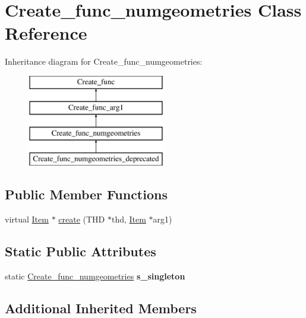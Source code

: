 \hypertarget{classCreate__func__numgeometries}{}\section{Create\+\_\+func\+\_\+numgeometries Class Reference}
\label{classCreate__func__numgeometries}
Inheritance diagram for Create\+\_\+func\+\_\+numgeometries\+:\begin{figure}[H]
\begin{center}
\leavevmode
\includegraphics[height=4.000000cm]{classCreate__func__numgeometries}
\end{center}
\end{figure}
\subsection*{Public Member Functions}
\begin{DoxyCompactItemize}
\item 
virtual \mbox{\hyperlink{classItem}{Item}} $\ast$ \mbox{\hyperlink{classCreate__func__numgeometries_a7271abfd27ec21a68910e66b908d3412}{create}} (T\+HD $\ast$thd, \mbox{\hyperlink{classItem}{Item}} $\ast$arg1)
\end{DoxyCompactItemize}
\subsection*{Static Public Attributes}
\begin{DoxyCompactItemize}
\item 
\mbox{\label{classCreate__func__numgeometries_abd15115591dfa275efd6f61537a8c1e5}} 
static \mbox{\hyperlink{classCreate__func__numgeometries}{Create\+\_\+func\+\_\+numgeometries}} {\bfseries s\+\_\+singleton}
\end{DoxyCompactItemize}
\subsection*{Additional Inherited Members}



